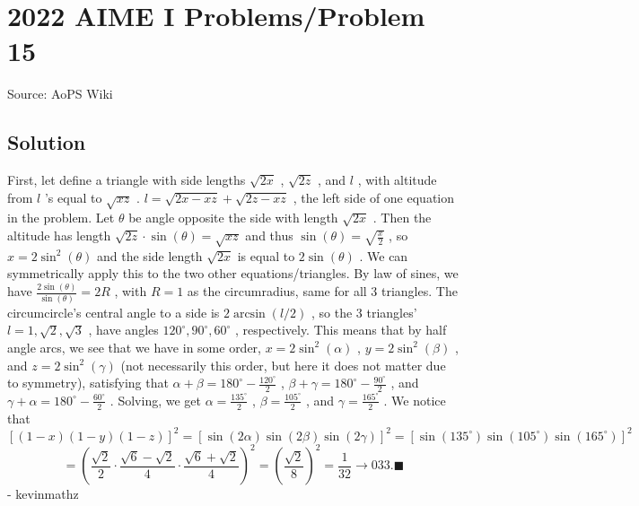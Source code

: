 \documentclass[12pt]{article}
\begin{document}
\section*{{2022 AIME I Problems/Problem 15}}
Source: AoPS Wiki

\subsection*{Solution}
First, let define a triangle with side lengths $\sqrt{2x}$ , $\sqrt{2z}$ , and $l$ , with altitude from $l$ 's equal to $\sqrt{xz}$ . $l = \sqrt{2x - xz} + \sqrt{2z - xz}$ , the left side of one equation in the problem. Let $\theta$ be angle opposite the side with length $\sqrt{2x}$ . Then the altitude has length $\sqrt{2z} \cdot \sin(\theta) = \sqrt{xz}$ and thus $\sin(\theta) = \sqrt{\frac{x}{2}}$ , so $x=2\sin^2(\theta)$ and the side length $\sqrt{2x}$ is equal to $2\sin(\theta)$ . We can symmetrically apply this to the two other equations/triangles. By law of sines, we have $\frac{2\sin(\theta)}{\sin(\theta)} = 2R$ , with $R=1$ as the circumradius, same for all 3 triangles.
The circumcircle's central angle to a side is $2 \arcsin(l/2)$ , so the 3 triangles' $l=1, \sqrt{2}, \sqrt{3}$ , have angles $120^{\circ}, 90^{\circ}, 60^{\circ}$ , respectively. This means that by half angle arcs, we see that we have in some order, $x=2\sin^2(\alpha)$ , $y=2\sin^2(\beta)$ , and $z=2\sin^2(\gamma)$ (not necessarily this order, but here it does not matter due to symmetry), satisfying that $\alpha+\beta=180^{\circ}-\frac{120^{\circ}}{2}$ , $\beta+\gamma=180^{\circ}-\frac{90^{\circ}}{2}$ , and $\gamma+\alpha=180^{\circ}-\frac{60^{\circ}}{2}$ . Solving, we get $\alpha=\frac{135^{\circ}}{2}$ , $\beta=\frac{105^{\circ}}{2}$ , and $\gamma=\frac{165^{\circ}}{2}$ . We notice that \[[(1-x)(1-y)(1-z)]^2=[\sin(2\alpha)\sin(2\beta)\sin(2\gamma)]^2=[\sin(135^{\circ})\sin(105^{\circ})\sin(165^{\circ})]^2\] \[=\left(\frac{\sqrt{2}}{2} \cdot \frac{\sqrt{6}-\sqrt{2}}{4} \cdot \frac{\sqrt{6}+\sqrt{2}}{4}\right)^2 = \left(\frac{\sqrt{2}}{8}\right)^2=\frac{1}{32} \to \boxed{033}. \blacksquare\] - kevinmathz
\end{document}
